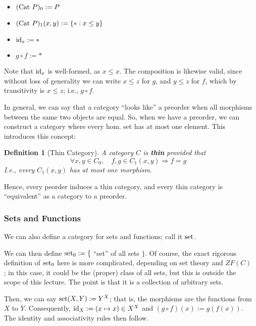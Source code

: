 \documentclass[12pt]{article}
\newtheorem{definition}{Definition}
\begin{document}
\begin{itemize}
    \item $(\textmd{Cat } P)_0 := P$
    \item $(\textmd{Cat } P)_1(x,y) := \{ \ast : x \leq y \}$
    \item $\textmd{id}_x := \ast$
    \item $g \circ f := \ast$
\end{itemize}

Note that $\textmd{id}_x$ is well-formed, as $x \leq x$. The composition is likewise valid, since without loss of generality we can write $x \leq z$ for $g$, and $y \leq z$ for $f$, which by transitivity is $x \leq z$; i.e., $g \circ f$.

\vspace{5mm}

In general, we can say that a category ``looks like'' a preorder when all morphisms between the same two objects are equal. So, when we have a preorder, we can construct a category where every hom. set has at most one element. This introduces this concept:

\begin{definition}[Thin Category]
    A category $C$ is \textbf{thin} provided that
    $$\forall x,y \in C_0, \quad f,g \in C_1(x,y) \Rightarrow f = g$$
    I.e., every $C_1(x,y)$ has at most one morphism.
\end{definition}

Hence, every peorder induces a thin category, and every thin category is ``equivalent'' as a category to a preorder.

\subsubsection{Sets and Functions}
We can also define a category for sets and functions; call it $\textmd{set}$.

We can then define $\textmd{set}_0 := \{$ ``set'' of all sets $\}$. Of course, the exact rigorous definition of $\textmd{set}_0$ here is more complicated, depending on set theory and $ZF(C)$; in this case, it could be the (proper) class of all sets, but this is outside the scope of this lecture. The point is that it is a collection of arbitrary sets.

Then, we can say $\textmd{set}(X,Y) := Y^X$; that is, the morphisms are the functions from $X$ to $Y$. Consequently, $\textmd{id}_X := (x \mapsto x) \in X^X$ and $(g \circ f)(x) := g(f(x))$. The identity and associativity rules then follow.
\end{document}
